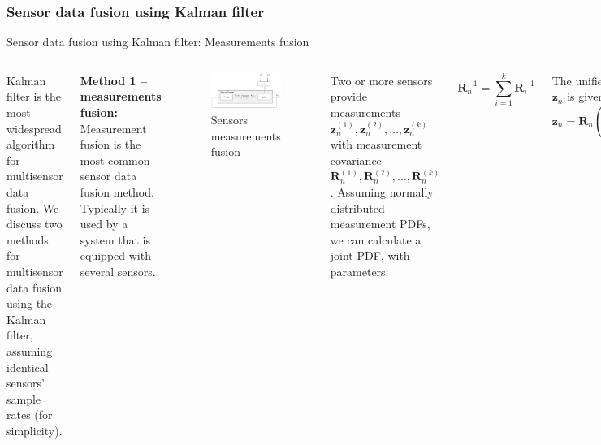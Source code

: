 \subsubsection{Sensor data fusion using Kalman filter}
\begin{frame}{Sensor data fusion using Kalman filter: Measurements fusion}
\begin{columns}
    Kalman filter is the most widespread algorithm for multisensor data fusion. We discuss two methods for multisensor data fusion using the Kalman filter, assuming identical sensors’ sample rates (for simplicity).

    \textbf{Method 1 – measurements fusion:} Measurement fusion is the most common sensor data fusion method. Typically it is used by a system that is equipped with several sensors.
    \begin{figure}
        \centering
        \includegraphics[width=0.9\linewidth]{Figures//Part4/TwoMeasurementsSensorFusion.png}
        \vspace{-10pt}
        \caption{Sensors measurements fusion}
        \vspace{-10pt}
    \end{figure}
        Two or more sensors provide measurements \( \bm{z}^{(1)}_n, \bm{z}^{(2)}_n, \ldots, \bm{z}^{(k)}_n \) with measurement covariance \( \bm{R}^{(1)}_n, \bm{R}^{(2)}_n, \ldots, \bm{R}^{(k)}_n \). Assuming normally distributed measurement PDFs, we can calculate a joint PDF, with parameters:


        \begin{equation*}
        \bm{R}^{-1}_n = \sum_{i=1}^{k} \bm{R}^{-1}_i
        \end{equation*}
        
        The unified measurement \( \bm{z}_n \) is given by:
        \begin{equation*}
        \bm{z}_n = \bm{R}_n \left( \sum_{i=1}^{k} \bm{R}^{(i)^{-1}}_n \bm{z}^{(i)}_n \right)
        \end{equation*}
        

\end{columns}
\end{frame}
